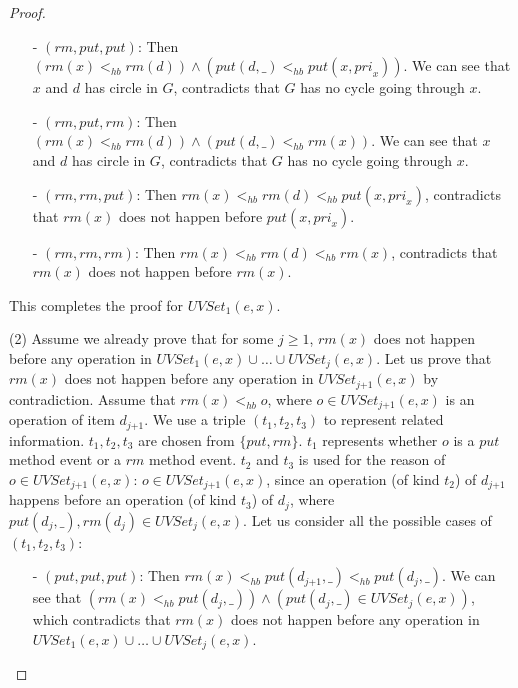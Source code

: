 \begin {proof}
\begin{itemize}
\item[-] $(\textit{rm},\textit{put},\textit{put})$: Then $( \textit{rm}(x) <_{hb} \textit{rm}(d) ) \wedge ( \textit{put}(d,\_) <_{hb} \textit{put}(x,\textit{pri}_x) )$. We can see that $x$ and $d$ has circle in $G$, contradicts that $G$ has no cycle going through $x$.

\item[-] $(\textit{rm},\textit{put},\textit{rm})$: Then $( \textit{rm}(x) <_{hb} \textit{rm}(d) ) \wedge ( \textit{put}(d,\_) <_{hb} \textit{rm}(x) )$. We can see that $x$ and $d$ has circle in $G$, contradicts that $G$ has no cycle going through $x$.

\item[-] $(\textit{rm},\textit{rm},\textit{put})$: Then $\textit{rm}(x) <_{hb} \textit{rm}(d) <_{hb} \textit{put}(x,\textit{pri}_x)$, contradicts that $\textit{rm}(x)$ does not happen before $\textit{put}(x,\textit{pri}_x)$.

\item[-] $(\textit{rm},\textit{rm},\textit{rm})$: Then $\textit{rm}(x) <_{hb} \textit{rm}(d) <_{hb} \textit{rm}(x)$, contradicts that $\textit{rm}(x)$ does not happen before $\textit{rm}(x)$.
\end{itemize}

This completes the proof for $\textit{UVSet}_1(e,x)$.

\noindent (2) Assume we already prove that for some $j \geq 1$, $\textit{rm}(x)$ does not happen before any operation in $\textit{UVSet}_1(e,x) \cup \ldots \cup \textit{UVSet}_j(e,x)$. Let us prove that $\textit{rm}(x)$ does not happen before any operation in $\textit{UVSet}_{\textit{j+1}}(e,x)$ by contradiction. Assume that $\textit{rm}(x) <_{hb} o$, where $o \in \textit{UVSet}_{\textit{j+1}}(e,x)$ is an operation of item $d_{\textit{j+1}}$. We use a triple $(t_1,t_2,t_3)$ to represent related information. $t_1,t_2,t_3$ are chosen from $\{ \textit{put},\textit{rm} \}$. $t_1$ represents whether $o$ is a $\textit{put}$ method event or a $\textit{rm}$ method event. $t_2$ and $t_3$ is used for the reason of $o \in \textit{UVSet}_{\textit{j+1}}(e,x)$: $o \in \textit{UVSet}_{\textit{j+1}}(e,x)$, since an operation (of kind $t_2$) of $d_{\textit{j+1}}$ happens before an operation (of kind $t_3$) of $d_j$, where $\textit{put}(d_j,\_), \textit{rm}(d_j) \in \textit{UVSet}_j(e,x)$. Let us consider all the possible cases of $(t_1,t_2,t_3)$:

\begin{itemize}
\setlength{\itemsep}{0.5pt}
\item[-] $(\textit{put},\textit{put},\textit{put})$: Then $\textit{rm}(x) <_{hb} \textit{put}(d_{\textit{j+1}},\_) <_{hb} \textit{put}(d_j,\_)$. We can see that $( \textit{rm}(x) <_{hb} \textit{put}(d_j,\_) ) \wedge ( \textit{put}(d_j,\_) \in \textit{UVSet}_j(e,x) )$, which contradicts that $\textit{rm}(x)$ does not happen before any operation in $\textit{UVSet}_1(e,x) \cup \ldots \cup \textit{UVSet}_j(e,x)$.


\end{itemize}
\end{proof}
